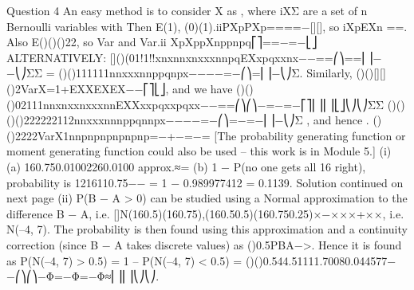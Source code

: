 Question 4
An easy method is to consider X as , where iXΣ are a set of n Bernoulli variables with Then E(1), (0)(1).iiPXpPXp====−[][], so iXpEXn ==.
Also E()()()22, so Var and Var.ii XpXppXnppnpq⎡⎤==−=−⎣⎦
ALTERNATIVELY: []()(01!1!!xnxnnxnxxxnnpqEXxpqxxnx−−==⎛⎞==⎜⎟−−⎝⎠ΣΣ
= ()()111111nnxxxnnppqnpx−−−−=−⎛⎞=⎜⎟−⎝⎠Σ.
Similarly, ()()[][]()2VarX=1+EXXEXEX−−⎡⎤⎣⎦, and we have
()()()02111nnxnxxnxxxnnEXXxxpqxxpqxx−−==⎛⎞⎛⎞−=−=−⎡⎤⎜⎟⎜⎟⎣⎦⎝⎠⎝⎠ΣΣ
()()()()222222112nnxxxnnnppqnnpx−−−−=−⎛⎞=−=−⎜⎟−⎝⎠Σ ,
and hence . ()()2222VarX1nnpnpnpnpnpnp=−+−=−=
[The probability generating function or moment generating function could also be used – this work is in Module 5.]
(i) (a) 160.750.01002260.0100 approx.≈=
(b) 1 − P(no one gets all 16 right), probability is {}1216110.75−−
= 1 − {0.9899774}12 = 0.1139.
Solution continued on next page
(ii) P(B − A > 0) can be studied using a Normal approximation to the difference B − A, i.e. []N(160.5)(160.75),(160.50.5)(160.750.25)×−×××+××, i.e. N(–4, 7).
The probability is then found using this approximation and a continuity correction (since B − A takes discrete values) as ()0.5PBA−>.
Hence it is found as
P(N(–4, 7) > 0.5) = 1 – P(N(–4, 7) < 0.5)
= ()()0.544.51111.70080.044577−−⎛⎞⎛⎞−Φ=−Φ=−Φ≈⎜⎟⎜⎟⎝⎠⎝⎠.